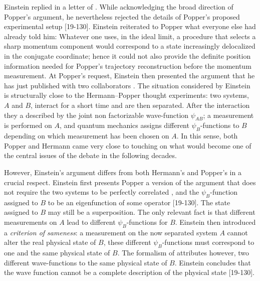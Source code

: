 \documentclass[final,12pt]{article}
\begin{document}
Einstein replied in a letter of . While acknowledging the broad direction of Popper’s argument, he nevertheless rejected the details of Popper’s proposed experimental setup [19-130]. Einstein reiterated to Popper what everyone else had already told him: Whatever  one uses, in the ideal limit, a procedure that selects a sharp momentum component would correspond to a state increasingly delocalized in the conjugate coordinate; hence it could not also provide the definite position information needed for Popper’s trajectory reconstruction before the momentum measurement. At Popper’s request, Einstein then presented the argument that he has just published with two collaborators \citep{Einstein1935}. The situation considered by Einstein is structurally close to the Hermann--Popper thought experiments: two systems, $A$ and $B$, interact for a short time and are then separated. After the interaction they a described by the joint non factorizable wave-function $\psi_{AB}$; a measurement is performed on $A$, and quantum mechanics assigns different $\psi_B$-functions to $B$ depending on which measurement has been chosen on $A$. In this sense, both Popper and Hermann came very close to touching on what would become one of the central issues of the debate in the following decades.

However, Einstein’s argument differs from both Hermann’s and Popper’s in a crucial respect. Einstein first presents Popper a version of the argument that does not require the two systems to be perfectly correlated , and the $\psi_B$-function assigned to $B$ to be an eigenfunction of some operator [19-130]. The state assigned to $B$ may still be a superposition. The only relevant fact is that different measurements on $A$ lead to different $\psi_B$-functions for $B$. Einstein then introduced a \textit{criterion of sameness}: a measurement on the now separated system $A$ cannot alter the real physical state of $B$, these different $\psi_B$-functions must correspond to one and the same physical state of $B$. The formalism of \qm attributes however, two different wave-functions to the same physical state of $B$. Einstein concludes that the wave function cannot be a complete description of the physical state [19-130].
\end{document}
